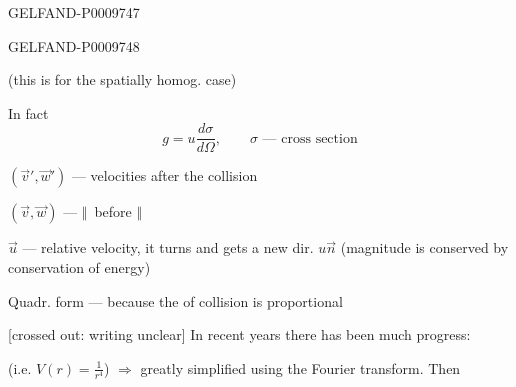 \begin{GelfandAdjacentEvidence}{GELFAND-P000974}{7}

\end{GelfandAdjacentEvidence}
\begin{GelfandAdjacentEvidence}{GELFAND-P000974}{8}


(this is for the spatially homog. case)

In fact
\begin{equation*}
 g=u\frac{d\sigma}{d\Omega},\qquad
 \sigma\text{ --- cross section}
 \tag{4}
\end{equation*}

$(\vec v',\vec w')$ --- velocities after the collision

$(\vec v,\vec w)$ --- \textemdash\(\Vert\)\textemdash\ before \textemdash\(\Vert\)\textemdash

$\vec u$ --- relative velocity, it turns and gets a new dir. $u\vec n$ (magnitude is conserved by conservation of energy)

Quadr. form --- because the  of collision is proportional

[crossed out: writing unclear] In recent years there has been much progress: 
\end{GelfandAdjacentEvidence}


(i.e. $V(r)=\frac{1}{r^4}$) $\Rightarrow$ greatly simplified using the Fourier transform. Then

